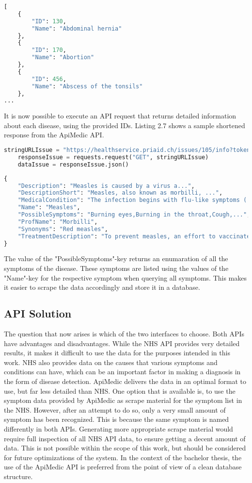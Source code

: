 \begin{lstlisting}[language=Python, caption={Response for the ApiMedic API (all issues)}]
[
	{
		"ID": 130,
		"Name": "Abdominal hernia"	
	},
	{
		"ID": 170,
		"Name": "Abortion"	
	},
	{
		"ID": 456,
		"Name": "Abscess of the tonsils"	
	},
...
\end{lstlisting}
It is now possible to execute an API request that returns detailed information about each disease, using the provided IDs. Listing 2.7 shows a sample shortened response from the ApiMedic API.
\begin{lstlisting}[language=Python, caption={Example Python Request for the ApiMedic API (single issue)}]
	stringURLIssue = "https://healthservice.priaid.ch/issues/105/info?token=YOUR_TOKEN"
	responseIssue = requests.request("GET", stringURLIssue)
	dataIssue = responseIssue.json()
\end{lstlisting}

\begin{lstlisting}[language=Python, caption={Response for the ApiMedic API (single issue)}]
{
	"Description": "Measles is caused by a virus a...",
	"DescriptionShort": "Measles, also known as morbilli, ...",
	"MedicalCondition": "The infection begins with flu-like symptoms ( ...",
	"Name": "Measles",
	"PossibleSymptoms": "Burning eyes,Burning in the throat,Cough,...",
	"ProfName": "Morbilli",
	"Synonyms": "Red measles",
	"TreatmentDescription": "To prevent measles, an effort to vaccinate ..."
}
\end{lstlisting}
\noindent 
The value of the "PossibleSymptoms"-key returns an enumaration of all the symptoms of the disease. These symptoms are listed using the values of the "Name"-key for the respective symptom when querying all symptoms. This makes it easier to scrape the data accordingly and store it in a database.

\subsection{API Solution}
The question that now arises is which of the two interfaces to choose. Both APIs have advantages and disadvantages. While the NHS API provides very detailed results, it makes it difficult to use the data for the purposes intended in this work. NHS also provides data on the causes that various symptoms and conditions can have, which can be an important factor in making a diagnosis in the form of disease detection. ApiMedic delivers the data in an optimal format to use, but far less detailed than NHS. One option that is available is, to use the symptom data provided by ApiMedic as scrape material for the symptom list in the NHS. However, after an attempt to do so, only a very small amount of symptom has been recognized. This is because the same symptom is named differently in both APIs. Generating more appropriate scrape material would require full inspection of all NHS API data, to ensure getting a decent amount of data. This is not possible within the scope of this work, but should be considered for future optimizations of the system.  In the context of the bachelor thesis, the use of the ApiMedic API is preferred from the point of view of a clean database structure.

